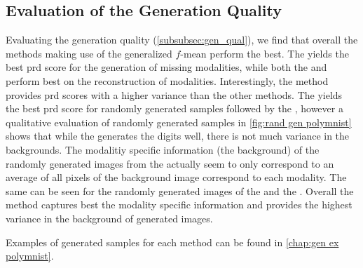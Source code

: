 \begin{sansmath}
\end{sansmath}

\subsection{Evaluation of the Generation Quality}
Evaluating the generation quality (\cref{subsubsec:gen_qual}), we find that overall the methods making use of the generalized $f$-mean perform the best.
The  yields the best prd score for the generation of missing modalities, while both the  and  perform best on the reconstruction of modalities.
Interestingly, the  method provides prd scores with a higher variance than the other methods.
The  yields the best prd score for randomly generated samples followed by the , however a qualitative evaluation of randomly generated samples in \cref{fig:rand gen polymnist} shows that while the  generates the digits well, there is not much variance in the backgrounds.
The modalitiy specific information (the background) of the randomly generated images from the  actually seem to only correspond to an average of all pixels of the background image correspond to each modality.
The same can be seen for the randomly generated images of the  and the .
Overall the  method captures best the modality specific information and provides the highest variance in the background of generated images.

Examples of generated samples for each method can be found in \cref{chap:gen ex polymnist}.


